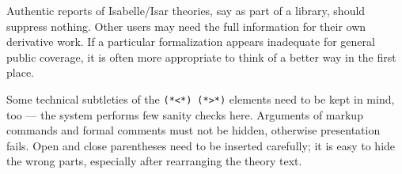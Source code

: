 \begin{isabellebody}
\begin{isamarkuptext}
  Authentic reports of Isabelle/Isar theories, say as part of a
  library, should suppress nothing.  Other users may need the full
  information for their own derivative work.  If a particular
  formalization appears inadequate for general public coverage, it is
  often more appropriate to think of a better way in the first place.

  \medskip Some technical subtleties of the
  \verb,(,\verb,*,\verb,<,\verb,*,\verb,),~\verb,(,\verb,*,\verb,>,\verb,*,\verb,),
  elements need to be kept in mind, too --- the system performs few
  sanity checks here.  Arguments of markup commands and formal
  comments must not be hidden, otherwise presentation fails.  Open and
  close parentheses need to be inserted carefully; it is easy to hide
  the wrong parts, especially after rearranging the theory text.%
\end{isamarkuptext}%
\isamarkuptrue%
\isamarkupfalse%
\end{isabellebody}%
